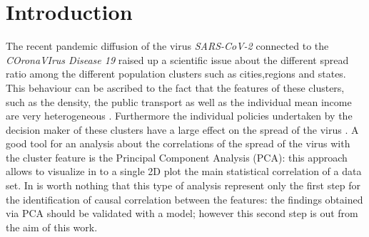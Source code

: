 \documentclass[
12pt, %
a4paper, %
oneside, %
headinclude,footinclude, %
BCOR5mm, %
]{scrartcl}
\begin{document}



\newpage %


\section{Introduction} \label{introduction}
The recent pandemic diffusion of the virus \textit{SARS-CoV-2} connected to the \textit{COronaVIrus Disease 19} raised up a scientific issue about the different spread ratio among the different population clusters such as cities,regions and states. This behaviour can be ascribed to the fact that the features of these clusters, such as the density, the public transport as well as the individual mean income are very heterogeneous \cite{sebhatu2020explaining,skorka2020macroecology}. Furthermore the individual policies undertaken by the decision maker of these clusters have a large effect on the spread of the virus \cite{block2020social}. A good tool for an analysis about the correlations of the spread of the virus with the cluster feature is the Principal Component Analysis (PCA): this approach allows to visualize in to a single 2D plot the main statistical correlation of a data set. In is worth nothing that this type of analysis represent only the first step for the identification of causal correlation between the features: the findings obtained via PCA should be validated with a model; however this second step is out from the aim of this work.  
\end{document}
